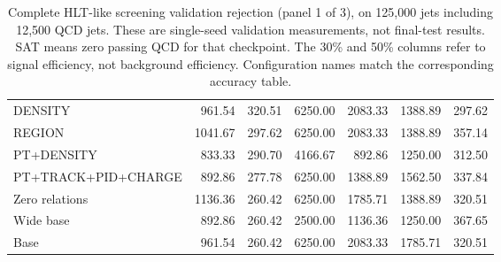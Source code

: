 \begin{table}[htbp]
\begin{tabularx}{\linewidth}{@{}Xrrrrrr@{}}
DENSITY & 961.54 & 320.51 & 6250.00 & 2083.33 & 1388.89 & 297.62 \\ %
REGION & 1041.67 & 297.62 & 6250.00 & 2083.33 & 1388.89 & 357.14 \\ %
PT+DENSITY & 833.33 & 290.70 & 4166.67 & 892.86 & 1250.00 & 312.50 \\ %
PT+TRACK+PID+CHARGE & 892.86 & 277.78 & 6250.00 & 1388.89 & 1562.50 & 337.84 \\ %
Zero relations & 1136.36 & 260.42 & 6250.00 & 1785.71 & 1388.89 & 320.51 \\ %
Wide base & 892.86 & 260.42 & 2500.00 & 1136.36 & 1250.00 & 367.65 \\ %
Base & 961.54 & 260.42 & 6250.00 & 2083.33 & 1785.71 & 320.51 \\ %
\bottomrule
\end{tabularx}
\caption{Complete HLT-like screening validation rejection (panel 1 of 3),
on 125,000 jets including 12,500 QCD jets. These are single-seed validation measurements, not final-test results.
SAT means zero passing QCD for that checkpoint.
The 30\% and 50\% columns refer to signal efficiency, not background
efficiency. Configuration names match the corresponding accuracy table.}
\label{tab:hlt-screen-rejection-1}
\end{table}

